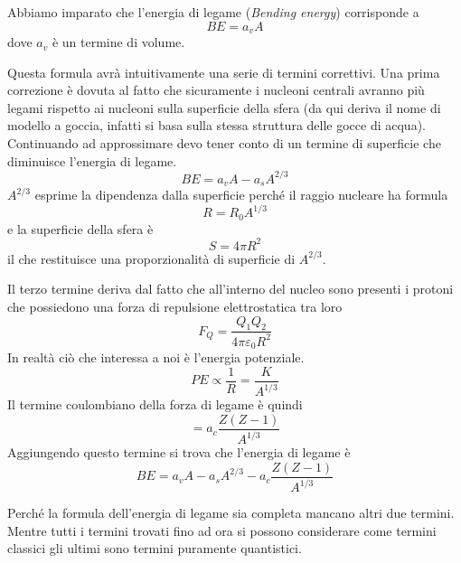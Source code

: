 Abbiamo imparato che l'energia di legame (\emph{Bending energy}) corrisponde a 
\begin{equation}
BE=a_vA
\end{equation}
dove $a_v$ è un termine di volume.

Questa formula avrà intuitivamente una serie di termini correttivi. 
Una prima correzione è dovuta al fatto che sicuramente i nucleoni centrali avranno più legami rispetto ai nucleoni sulla superficie della sfera (da qui deriva il nome di modello a goccia, infatti si basa sulla stessa struttura delle gocce di acqua).
Continuando ad approssimare devo tener conto di un termine di superficie che diminuisce l'energia di legame.
\begin{equation}
BE=a_vA-a_sA^{2/3}
\end{equation}
$A^{2/3}$ esprime la dipendenza dalla superficie perché il raggio nucleare ha formula
\[
R=R_0A^{1/3}
\]
e la superficie della sfera è
\[
S=4\pi R^2
\]
il che restituisce una proporzionalità di superficie di $A^{2/3}$.

Il terzo termine deriva dal fatto che all'interno del nucleo sono presenti i protoni che possiedono una forza di repulsione elettrostatica tra loro
\[
F_Q=\frac{Q_1Q_2}{4\pi \varepsilon_0 R^2}
\]
In realtà ciò che interessa a noi è l'energia potenziale.
\[
PE\propto \frac{1}{R}=\frac{K}{A^{1/3}}
\]
Il termine coulombiano della forza di legame è quindi
\begin{equation}
=a_c\frac{Z(Z-1)}{A^{1/3}}
\end{equation}
Aggiungendo questo termine si trova che l'energia di legame è
\begin{equation}
BE=a_vA-a_sA^{2/3}-a_c\frac{Z(Z-1)}{A^{1/3}}
\end{equation}

Perché la formula dell'energia di legame sia completa mancano altri due termini.
Mentre tutti i termini trovati fino ad ora si possono considerare come termini classici gli ultimi sono termini puramente quantistici. 

